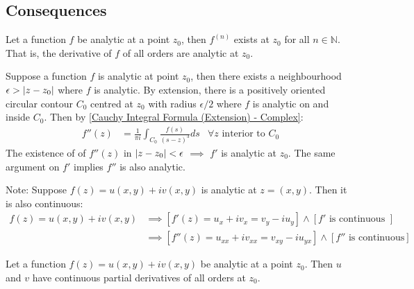 \documentclass[12pt, english]{book}
\makeatletter
\renewenvironment{proof}[1][\proofname]{\par
	\pushQED{\qed}%
	\normalfont \topsep6\p@\@plus6\p@\relax
	\list{}{%
		\settowidth{\leftmargin}{\itshape\proofname:\hskip\labelsep}%
		\setlength{\labelwidth}{0pt}%
		\setlength{\itemindent}{-\leftmargin}%
		}%
	\item[\hskip\labelsep\itshape#1\@addpunct{:}]\ignorespaces
	}{\popQED\endlist\@endpefalse}
\makeatother
\begin{document}
	\subsection{Consequences} \label{Cauchy Integral Theorem Consequences Subsection - Complex}
	
	\begin{theorem}
		 
		\label{Analytic implies existance of high order derivatives theorem - Complex}
		Let a function \(f\) be analytic at a point \(z_0\), then \(f^{(n)}\) exists at \(z_0\) for all \(n \in \mathbb{N}\). That is, the derivative of \(f\) of all orders are analytic at \(z_0\).
	\end{theorem}
	\begin{proof}
		Suppose a function \(f\) is analytic at point \(z_0\), then there exists a neighbourhood \(\epsilon > \abs{z - z_0}\) where \(f\) is analytic. By extension, there is a positively oriented circular contour \(C_0\) centred at \(z_0\) with radius \(\epsilon / 2\) where \(f\) is analytic on and inside \(C_0\).
		Then by \cref{Cauchy Integral Formula (Extension) - Complex}:
		\begin{align*}
			f''(z) &= \frac{1}{\pi i} \int_{C_0} \frac{f(s)}{(s-z)^3} ds & \forall z \text{ interior to } C_0
		\end{align*}
		The existence of of \(f''(z)\) in \(\abs{z-z_0}<\epsilon\) \(\implies\) \(f'\) is analytic at \(z_0\). The same argument on \(f'\) implies \(f''\) is also analytic.
	\end{proof}
	
	Note: Suppose \(f(z) = u(x,y) + iv(x,y)\) is analytic at \(z = (x,y)\). Then it is also continuous: 
	\begin{align*}
		f(z) = u(x,y) + iv(x,y) 
		&\implies [f'(z) = u_x + iv_x = v_y - iu_y] \land [f' \text{ is continuous }] \\
		&\implies [f''(z) = u_{xx} + iv_{xx} = v_{xy} - iu_{yx}] \land [f'' \text{ is continuous}]
 	\end{align*}
	
	\begin{corollary}
		Let a function \(f(z) = u(x,y) + iv(x,y)\) be analytic at a point \(z_0\). Then \(u\) and \(v\) have continuous partial derivatives of all orders at \(z_0\). 
	\end{corollary}
\end{document}
